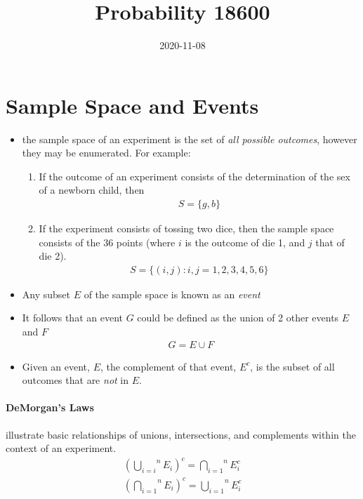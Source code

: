 \documentclass{article}
\title{Probability 18600}
\date{2020-11-08}
\theoremstyle{definition}
\theoremstyle{axiom}
\theoremstyle{proposition}
\begin{document}
\maketitle
\setcounter{section}{1}
\section{Sample Space and Events}
\begin{itemize}
  \item the sample space of an experiment is the set of \textit{all possible outcomes}, however
        they may be enumerated.  For example:
        \begin{enumerate}
          \item If the outcome of an experiment consists of the determination of the sex of a
                newborn child, then
                \begin{align*}
                  S=\{g,b\}
                \end{align*}
          \item If the experiment consists of tossing two dice, then the sample space consists
                of the 36 points (where $i$ is the outcome of die 1, and $j$ that of die 2).
                \begin{align*}
                  S=\{(i,j):i,j=1,2,3,4,5,6\}
                \end{align*}
        \end{enumerate}
  \item Any subset $E$ of the sample space is known as an \textit{event}
  \item It follows that an event $G$ could be defined as the union of 2 other events $E$ and $F$
        \begin{align*}
          G={E \cup F}
        \end{align*}
  \item Given an event, $E$, the complement of that event, $E^{c}$, is the subset of all outcomes that are \textit{not} in $E$.
\end{itemize}
\paragraph{DeMorgan's Laws} illustrate basic relationships of unions, intersections, and complements within the context of an experiment.
\begin{align*}
  \left(
  \stackrel{n}{
    \bigcup_{i=i}
  }
  E_{i}
  \right)^{c}=
  \stackrel{n}{
    \bigcap_{i=1}
  }
  E_{i}^{c} \\
  \left(
  \stackrel{n}{
    \bigcap_{i=1}
  }
  E_{i}
  \right)^{c}=
  \stackrel{n}{
    \bigcup_{i=1}
  }
  E_{i}^{c}
\end{align*}
\end{document}

